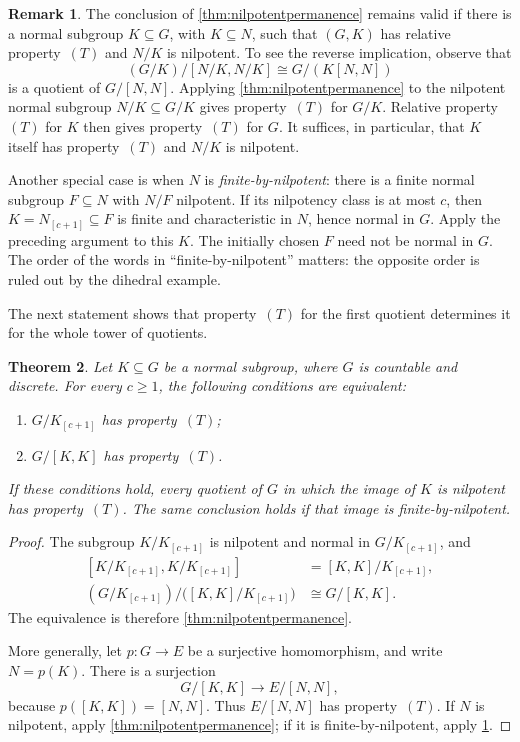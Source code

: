 \documentclass[11pt,a4paper]{article}
\newtheorem{theorem}{Theorem}[section]
\theoremstyle{definition}
\newtheorem{remark}[theorem]{Remark}
\newcommand{\rt}{(T)}
\begin{document}
\begin{remark}
\label{rem:nilpotentextensions}
The conclusion of \cref{thm:nilpotentpermanence} remains valid
if there is a normal subgroup \(K\subseteq G\), with \(K\subseteq N\), such that
\((G,K)\) has relative property~\(\rt\) and \(N/K\) is
nilpotent. To see the reverse implication, observe that
\[
 (G/K)/[N/K,N/K]\cong G/(K[N,N])
\]
is a quotient of \(G/[N,N]\). Applying \cref{thm:nilpotentpermanence}
to the nilpotent normal subgroup \(N/K\subseteq G/K\) gives
property~\(\rt\) for \(G/K\). Relative property~\(\rt\) for \(K\)
then gives property~\(\rt\) for \(G\).
It suffices, in particular, that \(K\) itself has
property~\(\rt\) and \(N/K\) is nilpotent.

Another special case is when \(N\) is \emph{finite-by-nilpotent}:
there is a finite normal subgroup \(F\subseteq N\) with
\(N/F\) nilpotent. If its nilpotency class is at most \(c\),
then \(K=N_{[c+1]}\subseteq F\) is finite and characteristic
in \(N\), hence normal in \(G\). Apply the preceding argument
to this \(K\). The initially chosen \(F\) need not be normal
in \(G\). The order of the words in ``finite-by-nilpotent''
matters: the opposite order is ruled out by the dihedral example.
\end{remark}

The next statement shows that property~\(\rt\) for the first quotient determines it for the whole tower of quotients.
\begin{theorem}
\label{thm:quotienttower}
Let \(K\subseteq G\) be a normal subgroup, where \(G\) is countable
and discrete. For every \(c\ge1\), the following conditions are equivalent:
\begin{enumerate}[label=\textup{(\roman*)},beginpenalty=10000,midpenalty=10000]
 \item \(G/K_{[c+1]}\) has property~\(\rt\);
 \item \(G/[K,K]\) has property~\(\rt\).
\end{enumerate}
If these conditions hold, every quotient
of \(G\) in which the image of \(K\) is nilpotent has
property~\(\rt\). The same conclusion holds if that image
is finite-by-nilpotent.
\end{theorem}
\begin{proof}
The subgroup \(K/K_{[c+1]}\) is nilpotent and normal in
\(G/K_{[c+1]}\), and
\[
 \begin{aligned}
 [K/K_{[c+1]},K/K_{[c+1]}]&=[K,K]/K_{[c+1]},\\
 (G/K_{[c+1]})/\bigl([K,K]/K_{[c+1]}\bigr)&\cong G/[K,K].
 \end{aligned}
\]
The equivalence is therefore \cref{thm:nilpotentpermanence}.

More generally, let \(p:G\rightarrow E\) be a surjective homomorphism, and write
\(N=p(K)\). There is a surjection
\[
 G/[K,K]\rightarrow E/[N,N],
\]
because \(p([K,K])=[N,N]\). Thus \(E/[N,N]\) has
property~\(\rt\). If \(N\) is nilpotent, apply
\cref{thm:nilpotentpermanence}; if it is finite-by-nilpotent,
apply \cref{rem:nilpotentextensions}.
\end{proof}
\end{document}
